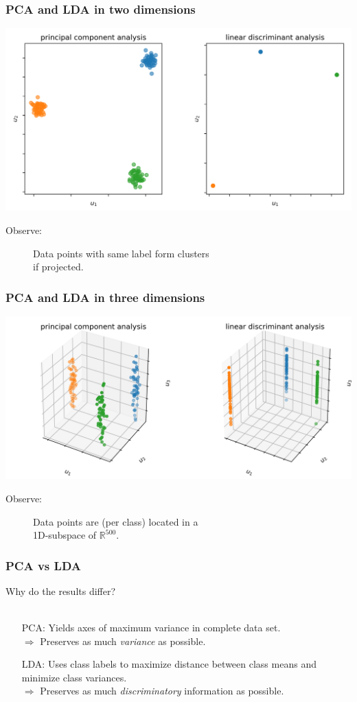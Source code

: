 \documentclass{beamer}
\begin{document}
\begin{frame}
	\frametitle{PCA and LDA in two dimensions}
	\includegraphics[width=\linewidth]{graphics/pca_lda_2d}
\begin{description}
	\item[Observe:]Data points with same label form clusters\\
	if projected.
\end{description}
\end{frame}

\begin{frame}
	\frametitle{PCA and LDA in three dimensions}
	\includegraphics[width=\linewidth]{graphics/pca_lda_3d}
\begin{description}
	\item[Observe:] Data points are (per class) located in a\\
	1D-subspace of $\mathbb{R}^{500}$.
\end{description}
\end{frame}

\begin{frame}
	\frametitle{PCA vs LDA}
	Why do the results differ?\\
\hfill\\
\begin{itemize}
\item[PCA:] Yields axes of maximum variance in complete data set.\\
$\Rightarrow$ Preserves as much \emph{variance} as possible.\hfill\\
\item[LDA:] Uses class labels to maximize distance between class means and minimize class variances.\\
$\Rightarrow$ Preserves as much \emph{discriminatory} information as possible.\\\hfill\\
\end{itemize}
\end{frame}
\end{document}
